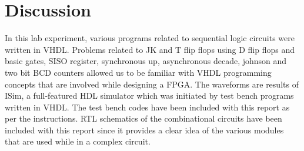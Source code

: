\documentclass{lab_sheet}
\begin{document}
    \section{Discussion}
    In this lab experiment, various programs related to sequential logic circuits were written in VHDL. Problems related to JK and T flip flops using D flip flops and basic gates, SISO register, synchronous up, asynchronous decade, johnson and two bit BCD counters allowed us to be familiar with VHDL programming concepts that are involved while designing a FPGA. The waveforms are results of ISim, a full-featured HDL simulator which was initiated by test bench programs written in VHDL. The test bench codes have been included with this report as per the instructions. RTL schematics of the combinational circuits have been included with this report since it provides a clear idea of the various modules that are used while in a complex circuit.
    \printbibliography[heading=bibintoc,title={Additional References},notcategory=cited]
\end{document}
